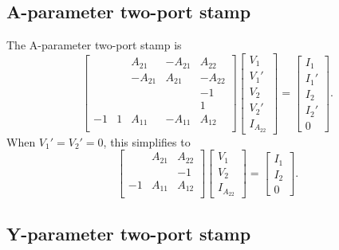\documentclass[a4paper, 12pt]{article}
\begin{document}
\subsection{A-parameter two-port stamp}

The A-parameter two-port stamp is
%
\begin{equation}
  \begin{bmatrix}
   &   &  A_{21} & -A_{21} & A_{22} \\ 
   &   & -A_{21} & A_{21}  & -A_{22} \\
   &   &         &        & -1    \\
   &   &         &        &  1    \\
   -1 & 1  & A_{11} & -A_{11} & A_{12} \\
  \end{bmatrix}
  \begin{bmatrix}
    V_1 \\ V_1' \\ V_2 \\ V_2' \\ I_{A_{22}}
  \end{bmatrix}
=
\begin{bmatrix}
  I_1 \\ I_1' \\ I_2 \\ I_2' \\ 0
\end{bmatrix}.
\end{equation}
%
When $V_1' = V_2' = 0$, this simplifies to
%
\begin{equation}
  \begin{bmatrix}
 &  A_{21}  & A_{22}  \\
         &       & -1 \\
      -1 & A_{11} & A_{12} \\
  \end{bmatrix}
  \begin{bmatrix}
    V_1 \\ V_2 \\ I_{A_{22}}
  \end{bmatrix}
=
\begin{bmatrix}
  I_1 \\ I_2 \\ 0
\end{bmatrix}.
\end{equation}
%



\subsection{Y-parameter two-port stamp}
\end{document}
